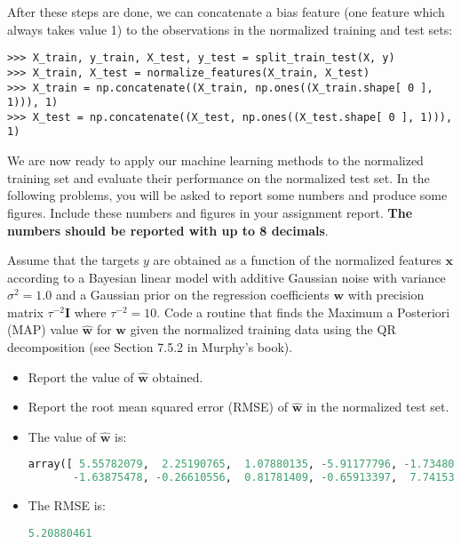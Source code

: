 \documentclass[submit]{harvardml}
\theoremstyle{plain}
\begin{document}
After these steps are done, we can concatenate a bias feature (one feature which
always takes value 1) to the observations in the normalized training and test sets:
\begin{verbatim}
>>> X_train, y_train, X_test, y_test = split_train_test(X, y)
>>> X_train, X_test = normalize_features(X_train, X_test)
>>> X_train = np.concatenate((X_train, np.ones((X_train.shape[ 0 ], 1))), 1)
>>> X_test = np.concatenate((X_test, np.ones((X_test.shape[ 0 ], 1))), 1)
\end{verbatim}
We are now ready to apply our machine learning methods to the normalized training set and
evaluate their performance on the normalized test set.
In the following problems, you will be asked to report some numbers and produce
some figures. Include these numbers and figures in your assignment report.
{\bf The numbers should be reported with up to 8 decimals}.



\begin{problem}[7pts]\label{prob:analytic_linear_model}
Assume that the targets $y$ are obtained as a function of the normalized
features $\mathbf{x}$ according to a Bayesian linear model with additive Gaussian noise with variance
$\sigma^2 = 1.0$ and a Gaussian prior on the regression coefficients $\mathbf{w}$
with precision matrix $\tau^{-2}\mathbf{I}$ where $\tau^{-2} = 10$. Code a routine that finds the Maximum a
Posteriori (MAP) value $\hat{\mathbf{w}}$ for $\mathbf{w}$ given the normalized
training data using the QR decomposition (see Section 7.5.2 in Murphy's book).
\begin{itemize}
\item Report the value of $\hat{\mathbf{w}}$ obtained.
\item Report the root mean squared error (RMSE) of $\hat{\mathbf{w}}$ in the normalized test set.
\end{itemize}
\end{problem}

\begin{itemize}
\item The value of $\hat{\mathbf{w}}$ is:
\begin{lstlisting}[language=Python]
array([ 5.55782079,  2.25190765,  1.07880135, -5.91177796, -1.73480336,
       -1.63875478, -0.26610556,  0.81781409, -0.65913397,  7.74153395])
\end{lstlisting}
\item The RMSE is:
\begin{lstlisting}[language=Python]
5.20880461
\end{lstlisting}
\end{itemize}
\end{document}
